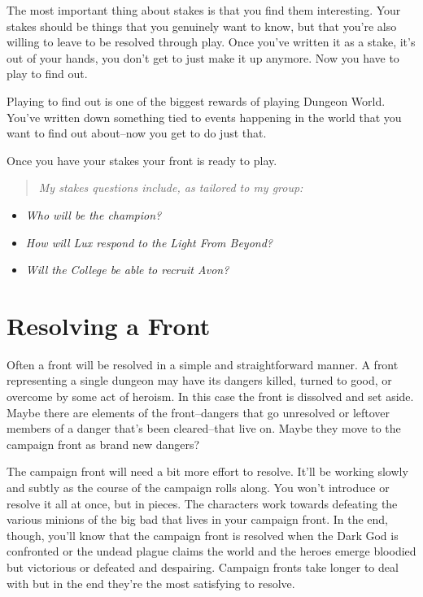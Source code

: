 The most important thing about stakes is that you find them interesting. Your stakes should be things that you genuinely want to know, but that you're also willing to leave to be resolved through play. Once you've written it as a stake, it's out of your hands, you don't get to just make it up anymore. Now you have to play to find out.


Playing to find out is one of the biggest rewards of playing Dungeon World. You've written down something tied to events happening in the world that you want to find out about--now you get to do just that.


Once you have your stakes your front is ready to play.


\begin{quote}
\emph{My stakes questions include, as tailored to my group:}
\end{quote}
\begin{itemize}
\item \emph{Who will be the champion?}
\item \emph{How will Lux respond to the Light From Beyond?}
\item \emph{Will the College be able to recruit Avon?}

\end{itemize}
\section*{Resolving a Front}



Often a front will be resolved in a simple and straightforward manner. A front representing a single dungeon may have its dangers killed, turned to good, or overcome by some act of heroism. In this case the front is dissolved and set aside. Maybe there are elements of the front--dangers that go unresolved or leftover members of a danger that's been cleared--that live on. Maybe they move to the campaign front as brand new dangers?


The campaign front will need a bit more effort to resolve. It'll be working slowly and subtly as the course of the campaign rolls along. You won't introduce or resolve it all at once, but in pieces. The characters work towards defeating the various minions of the big bad that lives in your campaign front. In the end, though, you'll know that the campaign front is resolved when the Dark God is confronted or the undead plague claims the world and the heroes emerge bloodied but victorious or defeated and despairing. Campaign fronts take longer to deal with but in the end they're the most satisfying to resolve.


